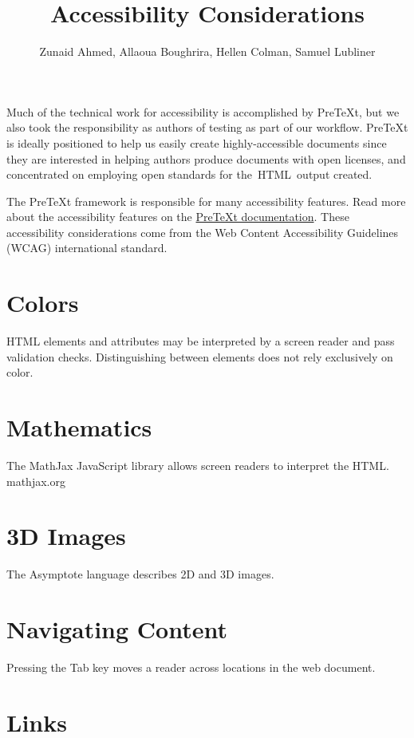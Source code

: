 \documentclass{article}
\title{Accessibility Considerations}
\author{Zunaid Ahmed, Allaoua Boughrira, Hellen Colman, Samuel Lubliner}
\begin{document}
\maketitle
Much of the technical work for accessibility is accomplished by PreTeXt, but we also took the responsibility as authors of testing as part of our workflow. PreTeXt is ideally positioned to help us easily create highly-accessible documents since they are interested in helping authors produce documents with open licenses, and concentrated on employing open standards for the HTML output created.

The PreTeXt framework is responsible for many accessibility features. Read more about the accessibility features on the \href{https://pretextbook.org/doc/guide/html/topic-accessibility.html}{PreTeXt documentation}. These accessibility considerations come from the Web Content Accessibility Guidelines (WCAG) international standard.


\section{Colors}

HTML elements and attributes may be interpreted by a screen reader and pass validation checks. Distinguishing between elements does not rely exclusively on color.


\section{Mathematics}

The MathJax JavaScript library allows screen readers to interpret the HTML.
mathjax.org


\section{3D Images}

The Asymptote language describes 2D and 3D images.


\section{Navigating Content}

Pressing the Tab key moves a reader across locations in the web document.


\section{Links}
\end{document}
